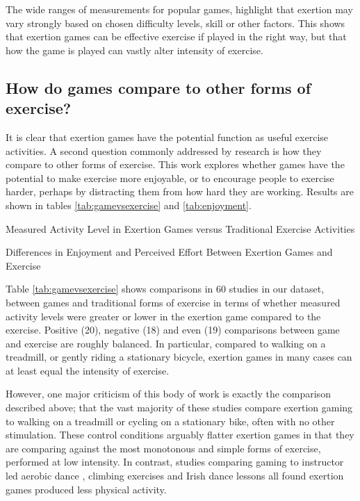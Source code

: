 The wide ranges of measurements for popular games, highlight that exertion may vary strongly based on chosen difficulty levels, skill or other factors. This shows that exertion games can be effective exercise if played in the right way, but that how the game is played can vastly alter intensity of exercise.


\subsection{How do games compare to other forms of exercise?}

It is clear that exertion games have the potential function as useful exercise activities. A second question commonly addressed by research is how they compare to other forms of exercise. This work explores whether games have the potential to make exercise more enjoyable, or to encourage people to exercise harder, perhaps by distracting them from how hard they are working. Results are shown in tables \ref{tab:gamevsexercise} and \ref{tab:enjoyment}.

\begin{table}
\caption{Measured Activity Level in Exertion Games versus Traditional Exercise Activities}
\label{tab:gamevsexercise}
\centering

\end{table}

\begin{table}
\caption{Differences in Enjoyment and Perceived Effort Between Exertion Games and Exercise}
\label{tab:enjoyment}
\centering


\end{table}

Table \ref{tab:gamevsexercise} shows comparisons in 60 studies in our dataset, between games and traditional forms of exercise in terms of whether measured activity levels were greater or lower in the exertion game compared to the exercise. Positive (20), negative (18) and even (19) comparisons between game and exercise are roughly balanced. In particular, compared to walking on a treadmill, or gently riding a stationary bicycle, exertion games in many cases can at least equal the intensity of exercise. 

However, one major criticism of this body of work is exactly the comparison described above; that the vast majority of these studies compare exertion gaming to walking on a treadmill or cycling on a stationary bike, often with no other stimulation. These control conditions arguably flatter exertion games in that they are comparing against the most monotonous and simple forms of exercise, performed at low intensity. In contrast, studies comparing gaming to instructor led aerobic dance \cite{Gao2013ChildrenSDance,eason2016comparison}, climbing exercises \cite{Sell2011EnergyActivities} and Irish dance lessons \cite{Rincker2017TheFitness} all found exertion games produced less physical activity. 

